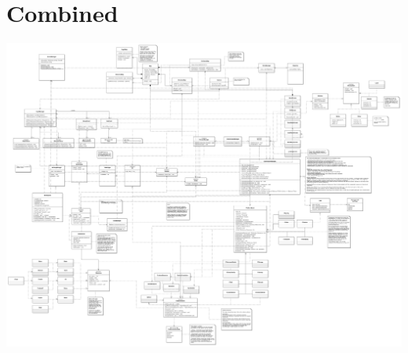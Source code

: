 \documentclass[12pt]{article}
\begin{document}
\section{Combined}
\includegraphics[width=\textwidth]{Combined}
\newline
\end{document}

